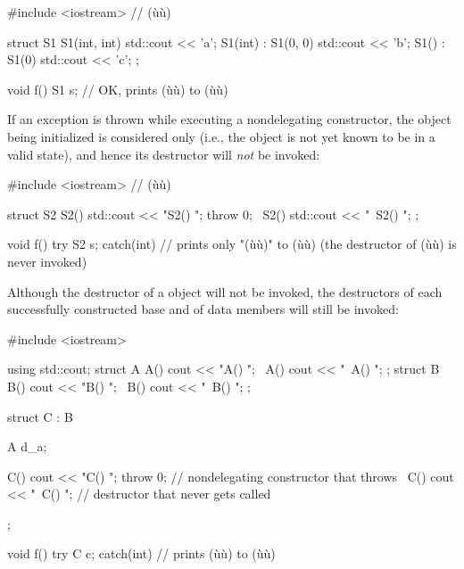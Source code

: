 \begin{emcppslisting}[language=C++]
#include <iostream>  // (ù{}ù)

struct S1
{
    S1(int, int)            { std::cout << 'a'; }
    S1(int)      : S1(0, 0) { std::cout << 'b'; }
    S1()         : S1(0)    { std::cout << 'c'; }
};

void f()
{
    S1 s;  // OK, prints (ù{}ù) to (ù{}ù)
}
\end{emcppslisting}
    
\noindent If an exception is thrown while executing a nondelegating constructor,
the object being initialized is considered only  (i.e., the object is not yet known to be in a valid state),
and hence its destructor will \emph{not} be
invoked:

\begin{emcppslisting}[language=C++]
#include <iostream>  // (ù{}ù)

struct S2
{
    S2()  { std::cout << "S2() ";  throw 0; }
    ~S2() { std::cout << "~S2() ";          }
};

void f() try { S2 s; } catch(int) { }
    // prints only "(ù{}ù)" to (ù{}ù) (the destructor of (ù{}ù) is never invoked)
\end{emcppslisting}   
    
\noindent Although the destructor of a  object will not be invoked, the destructors of
each successfully constructed base and of data members will still be
invoked:

\begin{emcppslisting}[language=C++]
#include <iostream>

using std::cout;
struct A { A() { cout << "A() "; } ~A() { cout << "~A() "; } };
struct B { B() { cout << "B() "; } ~B() { cout << "~B() "; } };

struct C : B
{
    A d_a;

    C()  { cout << "C() "; throw 0; }  // nondelegating constructor that throws
    ~C() { cout << "~C() ";         }  // destructor that never gets called
};

void f() try { C c; } catch(int) { }
    // prints (ù{}ù) to (ù{}ù)
\end{emcppslisting}
    
